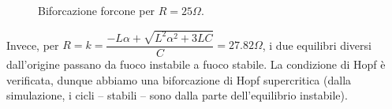 \documentclass[11pt, a4paper]{article}
\begin{document}
\begin{enumerate}
\begin{figure}
\begin{center}
\vfill
{}
\caption{Biforcazione forcone per $R=25 \Omega$.}
\label{fig:forcone}
\end{center}
\end{figure}

Invece, per $R=k=\dfrac{-L\alpha + \sqrt{L^2\alpha^2+3LC}}{C} = 27.82 \Omega$, i due equilibri diversi dall'origine passano da fuoco instabile a fuoco stabile. La condizione di Hopf è verificata, dunque abbiamo una biforcazione di Hopf supercritica (dalla simulazione, i cicli – stabili – sono dalla parte dell'equilibrio instabile).


\end{enumerate}
\end{document}
